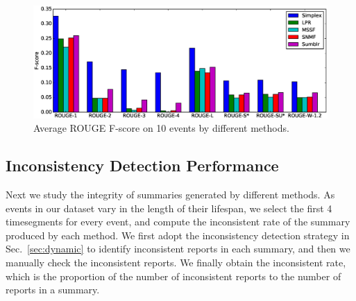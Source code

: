 \documentclass[envcountsame]{llncs}
\begin{document}
\begin{figure}\label{fig:rouge}
    \centering
    \includegraphics[width=\textwidth]{rouge.eps}
\caption{Average ROUGE F-score on 10 events by different methods.}
\end{figure}



\subsection{Inconsistency Detection Performance}
Next we study the integrity of summaries generated by different methods. As events in our dataset vary in the length of their lifespan, we select the first 4 timesegments for every event, and compute the inconsistent rate of the summary produced by each method. We first adopt the inconsistency detection strategy in Sec.~\ref{sec:dynamic} to identify inconsistent reports in each summary, and then we manually check the inconsistent reports. We finally obtain the inconsistent rate, which is the proportion of the number of inconsistent reports to the number of reports in a summary.  
\end{document}
